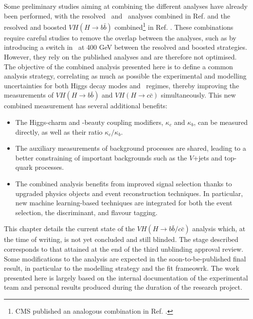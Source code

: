 Some preliminary studies aiming at combining the different analyses have already been performed, with the resolved \vhb\ and \vhc\ analyses combined in Ref. \cite{Collaboration:2721696} and the resolved and boosted $VH (H \rightarrow b\bar{b})$ combined\footnote{CMS published an analogous combination in Ref. \cite{CMS-PAS-HIG-20-001}.} in Ref. \cite{ATLAS:2021wqh}. These combinations require careful studies to remove the overlap between the analyses, such as by introducing a switch in \ptv\ at 400 GeV between the resolved and boosted strategies. However, they rely on the published analyses and are therefore not optimised. The objective of the combined analysis presented here is to define a common analysis strategy, correlating as much as possible the experimental and modelling uncertainties for both Higgs decay modes and \ptv\ regimes, thereby improving the measurements of $VH (H \rightarrow b\bar{b})$ and $VH (H \rightarrow c\bar{c})$ simultaneously. This new combined measurement has several additional benefits: 
\begin{itemize}
\item The Higgs-charm and -beauty coupling modifiers, $\kappa_c$ and $\kappa_b$, can be measured directly, as well as their ratio $\kappa_c/\kappa_b$. 
\item The auxiliary measurements of background processes are shared, leading to a better constraining of important backgrounds such as the $V$+jets and top-quark processes.
\item The combined analysis benefits from improved signal selection thanks to upgraded physics objects and event reconstruction techniques. In particular, new machine learning-based techniques are integrated for both the event selection, the discriminant, and flavour tagging.
\end{itemize}

This chapter details the current state of the $VH (H\rightarrow b\bar{b}/c\bar{c})$  analysis which, at the time of writing, is not yet concluded and still blinded. The stage described corresponds to that attained at the end of the third unblinding approval review. Some modifications to the analysis are expected in the soon-to-be-published final result, in particular to the modelling strategy and the fit frameowrk. The work presented here is largely based on the internal documentation of the experimental team and personal results produced during the duration of the research project. 

